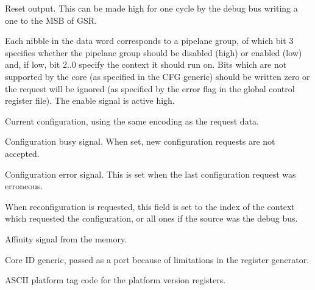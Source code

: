 
\globalInterface{}

\ifaceSubGroup{}
Reset output. This can be made high for one cycle by the debug bus writing a one
to the MSB of GSR.

\ifaceSubGroup{}
Each nibble in the data word corresponds to a pipelane group, of which bit 3 
specifies whether the pipelane group should be disabled (high) or enabled (low) 
and, if low, bit 2..0 specify the context it should run on. Bits which are not 
supported by the core (as specified in the CFG generic) should be written zero 
or the request will be ignored (as specified by the error flag in the global 
control register file). The enable signal is active high.

\ifaceSubGroup{}
Current configuration, using the same encoding as the request data.
    
\ifaceSubGroup{}
Configuration busy signal. When set, new configuration requests are not 
accepted.
    
\ifaceSubGroup{}
Configuration error signal. This is set when the last configuration request was 
erroneous.
    
\ifaceSubGroup{}
When reconfiguration is requested, this field is set to the index of the context 
which requested the configuration, or all ones if the source was the debug bus.

\ifaceSubGroup{}
Affinity signal from the memory.

\ifaceSubGroup{}
Core ID generic, passed as a port because of limitations in the register
generator.

\ifaceSubGroup{}
ASCII platform tag code for the platform version registers.

